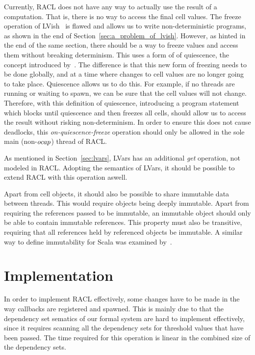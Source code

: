 Currently, RACL does not have any way to actually use the result of a
computation. That is, there is no way to access the final cell values. The
freeze operation of LVish~\parencite{kuper2014freeze} is flawed and allows us to
write non-deterministic programs, as shown in the end of
Section~\ref{sec:a_problem_of_lvish}. However, as hinted in the end of the same
section, there should be a way to freeze values and access them without breaking
determinism.  This uses a form of of quiescence, the concept introduced
by~\textcite{kuper2014freeze}. The difference is that this new form of freezing
needs to be done globally, and at a time where changes to cell values are no
longer going to take place. Quiescence allows us to do this. For example, if no
threads are running or waiting to spawn, we can be sure that the cell values
will not change. Therefore, with this definition of quiescence, introducing a
program statement which blocks until quiescence and then freezes all cells,
should allow us to access the result without risking non-determinism. In order
to ensure this does not cause deadlocks, this \emph{on-quiescence-freeze}
operation should only be allowed in the sole main (non-$\mbox{$ocap$}$) thread of RACL.

As mentioned in Section~\ref{sec:lvars}, LVars has an additional \emph{get}
operation, not modeled in RACL. Adopting the semantics of LVars, it should be
possible to extend RACL with this operation aswell.

Apart from cell objects, it should also be possible to share immutable data
between threads. This would require objects being deeply immutable. Apart from
requiring the references passed to be immutable, an immutable object should only be able
to contain immutable references. This property must also be transitive,
requiring that all references held by referenced objects be immutable. A similar way
to define immutability for Scala was examined by~\textcite{HallerA17}.

\section{Implementation}%
\label{sec:implementation}

In order to implement RACL effectively, some changes have to be made in the way
callbacks are registered and spawned. This is mainly due to that the dependency
set sematics of our formal system are hard to implement effectively, since it
requires scanning all the dependency sets for threshold values that have been
passed. The time required for this operation is linear in the combined size of
the dependency sets.  

